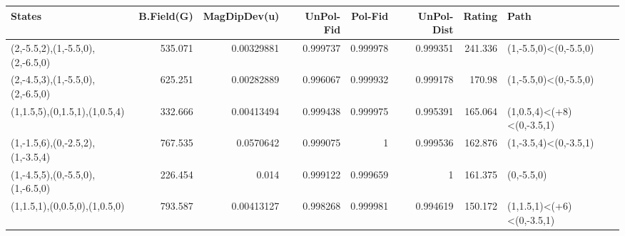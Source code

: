 \begin{tabular}{lrrrrrrl}
\hline
 States                           &   B.Field(G) &   MagDipDev(u) &   UnPol-Fid &   Pol-Fid &   UnPol-Dist &   Rating & Path                      \\
\hline
 (2,-5.5,2),(1,-5.5,0),(2,-6.5,0) &      535.071 &     0.00329881 &    0.999737 &  0.999978 &     0.999351 &  241.336 & (1,-5.5,0)<(0,-5.5,0)     \\
 (2,-4.5,3),(1,-5.5,0),(2,-6.5,0) &      625.251 &     0.00282889 &    0.996067 &  0.999932 &     0.999178 &  170.98  & (1,-5.5,0)<(0,-5.5,0)     \\
 (1,1.5,5),(0,1.5,1),(1,0.5,4)    &      332.666 &     0.00413494 &    0.999438 &  0.999975 &     0.995391 &  165.064 & (1,0.5,4)<(+8)<(0,-3.5,1) \\
 (1,-1.5,6),(0,-2.5,2),(1,-3.5,4) &      767.535 &     0.0570642  &    0.999075 &  1        &     0.999536 &  162.876 & (1,-3.5,4)<(0,-3.5,1)     \\
 (1,-4.5,5),(0,-5.5,0),(1,-6.5,0) &      226.454 &     0.014      &    0.999122 &  0.999659 &     1        &  161.375 & (0,-5.5,0)                \\
 (1,1.5,1),(0,0.5,0),(1,0.5,0)    &      793.587 &     0.00413127 &    0.998268 &  0.999981 &     0.994619 &  150.172 & (1,1.5,1)<(+6)<(0,-3.5,1) \\
\hline
\end{tabular}